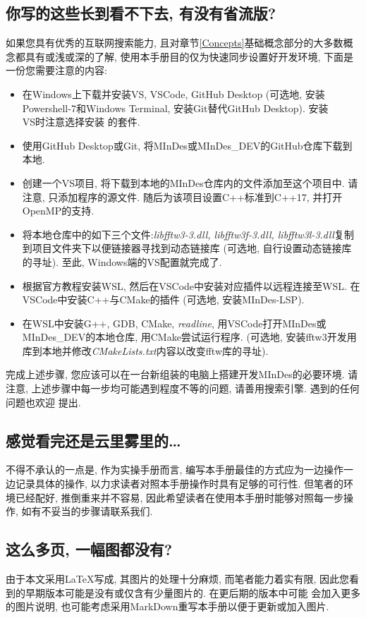 \subsection{你写的这些长到看不下去, 有没有省流版?}
如果您具有优秀的互联网搜索能力, 且对章节\ref{Concepts}基础概念部分的大多数概念都具有或浅或深的了解, 使用本手册目的仅为快速同步设置好开发环境,
下面是一份您需要注意的内容:
\begin{itemize}
    \item 在Windows上下载并安装VS, VSCode, GitHub Desktop (可选地, 安装\\Powershell-7和Windows Terminal, 安装Git替代GitHub Desktop). 安装\\VS时注意选择安装
    {}的套件.
    \item 使用GitHub Desktop或Git, 将MInDes或MInDes\_DEV的GitHub仓库下载到本地.
    \item 创建一个VS项目, 将下载到本地的MInDes仓库内的文件添加至这个项目中. 请注意, 只添加程序的源文件. 随后为该项目设置C++标准到C++17, 并打开OpenMP的支持.
    \item 将本地仓库中的如下三个文件:\emph{libfftw3-3.dll, libfftw3f-3.dll, libfftw3l-3.dll}复制到项目文件夹下以便链接器寻找到动态链接库
    (可选地, 自行设置动态链接库的寻址). 至此, Windows端的VS配置就完成了.
    \item 根据官方教程安装WSL, 然后在VSCode中安装对应插件以远程连接至WSL. 在VSCode中安装C++与CMake的插件 (可选地, 安装MInDes-LSP).
    \item 在WSL中安装G++, GDB, CMake, \emph{readline}, 用VSCode打开MInDes或\\MInDes\_DEV的本地仓库, 用CMake尝试运行程序.
    (可选地, 安装fftw3开发用库到本地并修改\emph{CMakeLists.txt}内容以改变fftw库的寻址).
\end{itemize}
完成上述步骤, 您应该可以在一台新组装的电脑上搭建开发MInDes的必要环境. 请注意, 上述步骤中每一步均可能遇到程度不等的问题, 请善用搜索引擎. 遇到的任何问题也欢迎
提出.

\subsection{感觉看完还是云里雾里的\dots}
不得不承认的一点是, 作为实操手册而言, 编写本手册最佳的方式应为一边操作一边记录具体的操作, 以力求读者对照本手册操作时具有足够的可行性.
但笔者的环境已经配好, 推倒重来并不容易, 因此希望读者在使用本手册时能够对照每一步操作, 如有不妥当的步骤请联系我们.

\subsection{这么多页, 一幅图都没有?}
由于本文采用{\LaTeX}写成, 其图片的处理十分麻烦, 而笔者能力着实有限, 因此您看到的早期版本可能是没有或仅含有少量图片的. 在更后期的版本中可能
会加入更多的图片说明, 也可能考虑采用MarkDown重写本手册以便于更新或加入图片.

